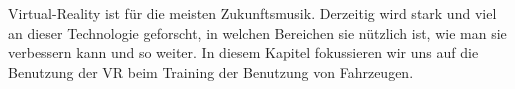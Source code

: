 Virtual-Reality ist für die meisten Zukunftsmusik. Derzeitig wird stark und viel an dieser Technologie geforscht, in welchen Bereichen sie nützlich ist, wie man sie verbessern kann und so weiter. In diesem Kapitel fokussieren wir uns auf die Benutzung der VR beim Training der Benutzung von Fahrzeugen.
